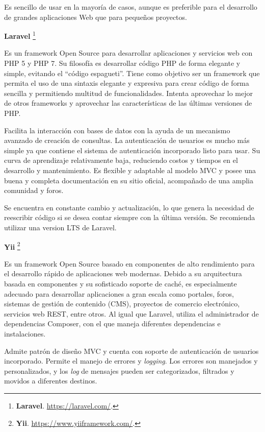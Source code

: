 \documentclass[11pt,oneside]{book}
\begin{document}
Es sencillo de usar en la mayoría de casos, aunque es preferible para el desarrollo de grandes aplicaciones Web que para pequeños proyectos.

\newpage
\textbf{Laravel} \footnote{\textbf{Laravel}. \url{https://laravel.com/}.}

Es un framework Open Source para desarrollar aplicaciones y servicios web con PHP 5 y PHP 7. Su filosofía es desarrollar código PHP de forma elegante y simple, evitando el ``código espagueti''. Tiene como objetivo ser un framework que permita el uso de una sintaxis elegante y expresiva para crear código de forma sencilla y permitiendo multitud de funcionalidades. Intenta aprovechar lo mejor de otros frameworks y aprovechar las características de las últimas versiones de PHP.

Facilita la interacción con bases de datos con la ayuda de un mecanismo avanzado de creación de consultas. La autenticación de usuarios es mucho más simple ya que contiene el sistema de autenticación incorporado listo para usar. Su curva de aprendizaje relativamente baja, reduciendo costos y tiempos en el desarrollo y mantenimiento. Es flexible y adaptable al modelo MVC y posee una buena y completa documentación en su sitio oficial, acompañado de una amplia comunidad y foros.

Se encuentra en constante cambio y actualización, lo que genera la necesidad de reescribir código si se desea contar siempre con la última versión. Se recomienda utilizar una version LTS de Laravel.

\textbf{Yii} \footnote{\textbf{Yii}. \url{https://www.yiiframework.com/}.}

Es un framework Open Source basado en componentes de alto rendimiento para el desarrollo rápido de aplicaciones web modernas. Debido a su arquitectura basada en componentes y su sofisticado soporte de caché, es especialmente adecuado para desarrollar aplicaciones a gran escala como portales, foros, sistemas de gestión de contenido (CMS), proyectos de comercio electrónico, servicios web REST, entre otros. Al igual que Laravel, utiliza el administrador de dependencias Composer, con el que maneja diferentes dependencias e instalaciones.

Admite patrón de diseño MVC y cuenta con soporte de autenticación de usuarios incorporado. Permite el manejo de errores y \textit{logging}. Los errores son manejados y personalizados, y los \textit{log} de mensajes pueden ser categorizados, filtrados y movidos a diferentes destinos.
\end{document}

